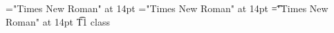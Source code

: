 \font\vxt="Times New Roman" at 14pt
\font\xt="Times New Roman" at 14pt
\font\t="Times New Roman" at 14pt
\t{T1 class }




\bye
